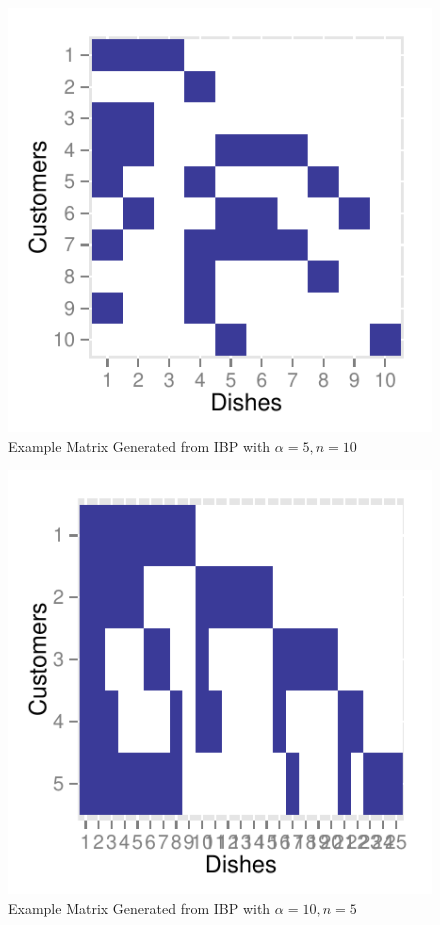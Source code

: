 \documentclass[12pt,letterpaper]{article}
\begin{document}
\begin{figure}[h!]
\begin{center}
\includegraphics{alpha5n10.pdf}
\caption{Example Matrix Generated from IBP with $\alpha=5, n=10$}
\label{alpha5n10}
\end{center}
\end{figure}

\begin{figure}[h!]
\begin{center}
\includegraphics{alpha10n5.pdf}
\caption{Example Matrix Generated from IBP with $\alpha=10, n=5$}
\label{alpha10n5}
\end{center}
\end{figure}
\end{document}
